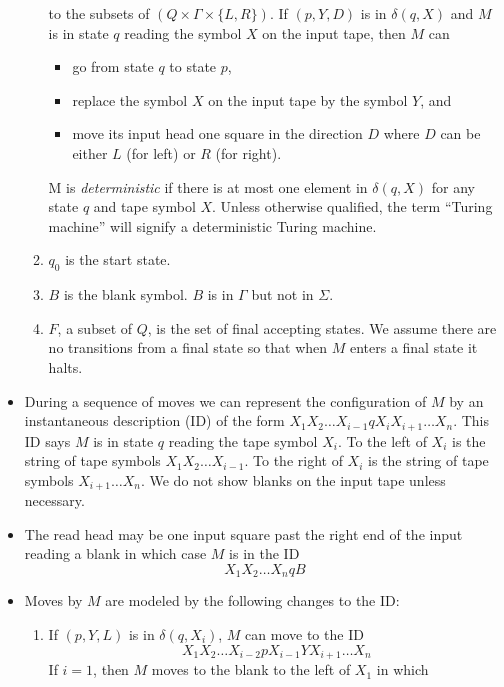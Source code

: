\documentclass[]{article}
\begin{document}
\begin{itemize}
\begin{enumerate}
        to the subsets of $(Q \times \Gamma \times \{L,R\})$. If $(p, Y, D)$ is 
        in $\delta(q,X)$ and $M$ is in state $q$ reading the symbol $X$ on the 
        input tape, then $M$ can
          \begin{itemize}
            \item go from state $q$ to state $p$,
            \item replace the symbol $X$ on the input tape by the symbol $Y$, 
            and
            \item move its input head one square in the direction $D$ where $D$ 
            can be either $L$ (for left) or $R$ (for right).
          \end{itemize}
        M is \emph{deterministic} if there is at most one element in $
        \delta(q,X)$ for any state $q$ and tape symbol $X$. Unless otherwise 
        qualified, the term ``Turing machine'' will signify a deterministic 
        Turing machine.
        \item $q_0$ is the start state.
        \item $B$ is the blank symbol. $B$ is in $\Gamma$ but not in $\Sigma$.
        \item $F$, a subset of $Q$, is the set of final accepting states. We 
        assume there are no transitions from a final state so that when $M$ 
        enters a final state it halts.
      \end{enumerate}
    \item During a sequence of moves we can represent the configuration of $M$ 
    by an instantaneous description (ID) of the form $X_1X_2\ldots{}X_{i-1}
    qX_iX_{i+1}\ldots{}X_n$. This ID says $M$ is in state $q$ reading the tape 
    symbol $X_i$. To the left of $X_i$ is the string of tape symbols 
    $X_1X_2\ldots{}X_{i-1}$. To the right of $X_i$ is the string of tape 
    symbols $X_{i+1}\ldots{}X_n$. We do not show blanks on the input tape 
    unless necessary.
    \item The read head may be one input square past the right end of the input 
    reading a blank in which case $M$ is in the ID
      \[ X_1X_2\ldots{}X_nqB \]
    \item Moves by $M$ are modeled by the following changes to the ID:
      \begin{enumerate}
        \item If $(p, Y, L)$ is in $\delta(q, X_i)$, $M$ can move to the ID
          \[ X_1X_2\ldots{}X_{i-2}pX_{i-1}YX_{i+1}\ldots{}X_n \]
        If $i = 1$, then $M$ moves to the blank to the left of $X_1$ in which 

\end{enumerate}
\end{itemize}
\end{document}
